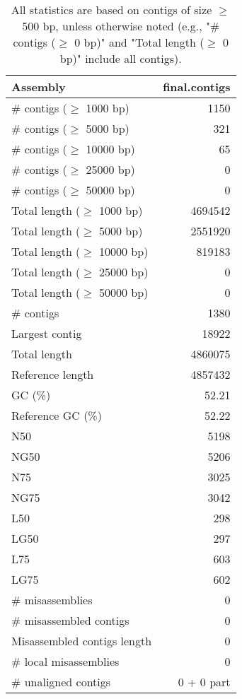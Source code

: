 \documentclass[12pt,a4paper]{article}
\begin{document}
\begin{table}[ht]
\begin{center}
\caption{All statistics are based on contigs of size $\geq$ 500 bp, unless otherwise noted (e.g., "\# contigs ($\geq$ 0 bp)" and "Total length ($\geq$ 0 bp)" include all contigs).}
\begin{tabular}{|l*{1}{|r}|}
\hline
Assembly & final.contigs \\ \hline
\# contigs ($\geq$ 1000 bp) & 1150 \\ \hline
\# contigs ($\geq$ 5000 bp) & 321 \\ \hline
\# contigs ($\geq$ 10000 bp) & 65 \\ \hline
\# contigs ($\geq$ 25000 bp) & 0 \\ \hline
\# contigs ($\geq$ 50000 bp) & 0 \\ \hline
Total length ($\geq$ 1000 bp) & 4694542 \\ \hline
Total length ($\geq$ 5000 bp) & 2551920 \\ \hline
Total length ($\geq$ 10000 bp) & 819183 \\ \hline
Total length ($\geq$ 25000 bp) & 0 \\ \hline
Total length ($\geq$ 50000 bp) & 0 \\ \hline
\# contigs & 1380 \\ \hline
Largest contig & 18922 \\ \hline
Total length & 4860075 \\ \hline
Reference length & 4857432 \\ \hline
GC (\%) & 52.21 \\ \hline
Reference GC (\%) & 52.22 \\ \hline
N50 & 5198 \\ \hline
NG50 & 5206 \\ \hline
N75 & 3025 \\ \hline
NG75 & 3042 \\ \hline
L50 & 298 \\ \hline
LG50 & 297 \\ \hline
L75 & 603 \\ \hline
LG75 & 602 \\ \hline
\# misassemblies & 0 \\ \hline
\# misassembled contigs & 0 \\ \hline
Misassembled contigs length & 0 \\ \hline
\# local misassemblies & 0 \\ \hline
\# unaligned contigs & 0 + 0 part \\ \hline

\end{tabular}
\end{center}
\end{table}
\end{document}
